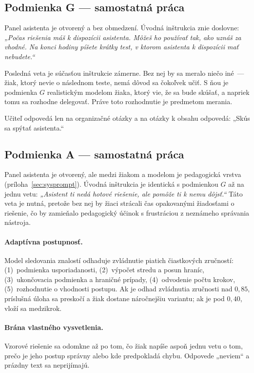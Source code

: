 \subsection{Podmienka G --- samostatná práca}

Panel asistenta je otvorený a bez obmedzení. Úvodná inštrukcia znie doslovne: \emph{„Počas riešenia máš k dispozícii asistenta. Môžeš ho používať tak, ako uznáš za vhodné. Na konci hodiny píšete krátky test, v ktorom asistenta k dispozícii mať nebudete.“}

Posledná veta je súčasťou inštrukcie zámerne. Bez nej by sa meralo niečo iné~--- žiak, ktorý nevie o následnom teste, nemá dôvod sa čokoľvek učiť. S ňou je podmienka $G$ realistickým modelom žiaka, ktorý vie, že sa bude skúšať, a napriek tomu sa rozhodne delegovať. Práve toto rozhodnutie je predmetom merania.

Učiteľ odpovedá len na organizačné otázky a na otázky k obsahu odpovedá: „Skús sa spýtať asistenta.“

\subsection{Podmienka A --- samostatná práca}

Panel asistenta je otvorený, ale medzi žiakom a modelom je pedagogická vrstva (príloha~\ref{sec:sysprompt}). Úvodná inštrukcia je identická s podmienkou $G$ až na jednu vetu: \emph{„Asistent ti nedá hotové riešenie, ale pomôže ti k nemu dôjsť.“} Táto veta je nutná, pretože bez nej by žiaci strácali čas opakovanými žiadosťami o riešenie, čo by zamieňalo pedagogický účinok s frustráciou z neznámeho správania nástroja.

\paragraph{Adaptívna postupnosť.} Model sledovania znalostí odhaduje zvládnutie piatich čiastkových zručností: (1)~podmienka usporiadanosti, (2)~výpočet stredu a posun hraníc, (3)~ukončovacia podmienka a hraničné prípady, (4)~odvodenie počtu krokov, (5)~rozhodnutie o vhodnosti postupu. Ak je odhad zvládnutia zručnosti nad $0{,}85$, príslušná úloha sa preskočí a žiak dostane náročnejšiu variantu; ak je pod $0{,}40$, vloží sa medzikrok.

\paragraph{Brána vlastného vysvetlenia.} Vzorové riešenie sa odomkne až po tom, čo žiak napíše aspoň jednu vetu o tom, prečo je jeho postup správny alebo kde predpokladá chybu. Odpovede „neviem“ a prázdny text sa neprijímajú.

